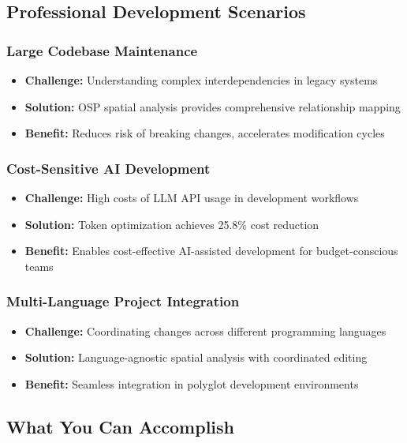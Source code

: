 \documentclass[12pt,a4paper]{article}
\begin{document}
\subsection{Professional Development Scenarios}

\subsubsection{Large Codebase Maintenance}
\begin{itemize}
    \item \textbf{Challenge:} Understanding complex interdependencies in legacy systems
    \item \textbf{Solution:} OSP spatial analysis provides comprehensive relationship mapping
    \item \textbf{Benefit:} Reduces risk of breaking changes, accelerates modification cycles
\end{itemize}

\subsubsection{Cost-Sensitive AI Development}
\begin{itemize}
    \item \textbf{Challenge:} High costs of LLM API usage in development workflows
    \item \textbf{Solution:} Token optimization achieves 25.8\% cost reduction
    \item \textbf{Benefit:} Enables cost-effective AI-assisted development for budget-conscious teams
\end{itemize}

\subsubsection{Multi-Language Project Integration}
\begin{itemize}
    \item \textbf{Challenge:} Coordinating changes across different programming languages
    \item \textbf{Solution:} Language-agnostic spatial analysis with coordinated editing
    \item \textbf{Benefit:} Seamless integration in polyglot development environments
\end{itemize}

\subsection{What You Can Accomplish}
\end{document}
